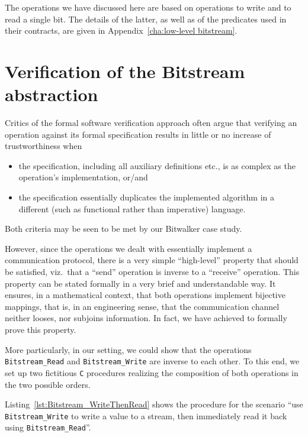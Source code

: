 The operations we have discussed here are based
on operations to write and to read a single bit.
%
The details of the latter, as well as of the predicates used in their
contracts, are given in Appendix~\ref{cha:low-level bitstream}.


\section{Verification of the Bitstream abstraction}
\label{sec:bitstream verif}



Critics of the formal software verification approach often 
argue that verifying an operation against its formal specification
results in little or no increase of trustworthiness when
%
\begin{itemize}
\item the specification, including all auxiliary definitions etc., is
	as complex as the operation's implementation, or/and
\item the specification essentially duplicates the implemented
	algorithm in a different (such as functional rather than
	imperative) language.
\end{itemize}
%
Both criteria may be seen to be met by our Bitwalker case study.



However, since the operations we dealt with essentially implement a
communication protocol, there is a very simple ``high-level'' property
that should be satisfied, viz.\ that a ``send'' operation is inverse
to a ``receive'' operation.
%
This property can be stated formally in a very brief and understandable
way.
%
It ensures, in a mathematical context, that both operations implement
bijective mappings, that is, in an engineering sense, that the
communication channel neither looses, nor subjoins information.
%
In fact, we have achieved to formally prove this property.




More particularly, in our setting, we could show that the operations
\lstinline{Bitstream_Read} and \lstinline{Bitstream_Write} are
inverse to each other.
%
To this end, we set up two fictitious \lstinline{C} procedures realizing
the composition of both operations in the two possible orders.




Listing~\ref{lst:Bitstream_WriteThenRead}
shows the procedure for the scenario ``use \lstinline{Bitstream_Write}
to write a value to a stream, then immediately read it back using
\lstinline{Bitstream_Read}''.



